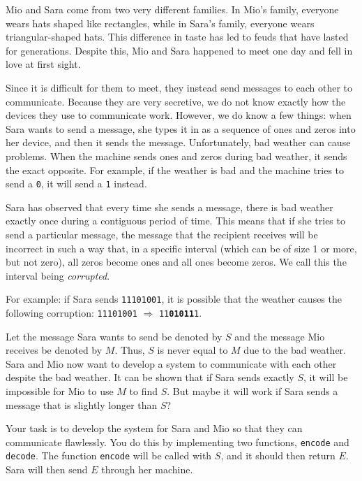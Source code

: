 \noindent

Mio and Sara come from two very different families. In Mio's family, everyone wears hats shaped like rectangles, 
while in Sara's family, everyone wears triangular-shaped hats. 
This difference in taste has led to feuds that have lasted for generations. 
Despite this, Mio and Sara happened to meet one day and fell in love at first sight.

Since it is difficult for them to meet, they instead send messages to each other to communicate. 
Because they are very secretive, we do not know exactly how the devices they use to communicate work. 
However, we do know a few things: when Sara wants to send a message, she types it 
in as a sequence of ones and zeros into her device, and then it sends the message. 
Unfortunately, bad weather can cause problems. When the machine 
sends ones and zeros during bad weather, it sends the exact opposite. For example, if the 
weather is bad and the machine tries to send a \texttt{0}, it will send a \texttt{1} instead.

Sara has observed that every time she sends a message, there is bad weather exactly once during
a contiguous period of time. 
This means that if she tries to send a particular message, the message that the recipient receives will be incorrect 
in such a way that, in a specific interval (which can be of size 1 or more, but not zero), all zeros become 
ones and all ones become zeros. We call this the interval being \textit{corrupted}.

For example: if Sara sends \texttt{11101001}, it is possible that the weather causes the following corruption: 
\texttt{11101001} $\Rightarrow$ \texttt{11\textbf{01011}1}.

Let the message Sara wants to send be denoted by $S$ and the message Mio receives be denoted by $M$. 
Thus, $S$ is never equal to $M$ due to the bad weather. Sara and Mio now want to develop a system to communicate 
with each other despite the bad weather. It can be shown that if Sara sends exactly $S$, it will be impossible for 
Mio to use $M$ to find $S$. But maybe it will work if Sara sends a message that is slightly longer than $S$?

Your task is to develop the system for Sara and Mio so that they can communicate flawlessly. 
You do this by implementing two functions, \texttt{encode} and \texttt{decode}. 
The function \texttt{encode} will be called with $S$, and it should then return $E$. 
Sara will then send $E$ through her machine. 


